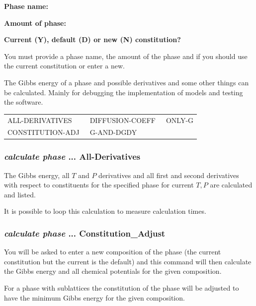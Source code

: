 \documentclass[11pt]{article}
\begin{document}
{\bf Phase name:}

{\bf Amount of phase:}

{\bf Current (Y), default (D) or new (N) constitution?}

You must provide a phase name, the amount of the phase and if you
should use the current constitution or enter a new.


The Gibbs energy of a phase and possible derivatives and some other
things can be calculated.  Mainly for debugging the implementation of
models and testing the software.

{\small
\begin{tabular}{lll}
ALL-DERIVATIVES  & DIFFUSION-COEFF~ & ONLY-G   \\
CONSTITUTION-ADJ~ & G-AND-DGDY        \\
\end{tabular}
}

\hypertarget{Calculate phase ... all-derivatives}{}
\hypertarget{Calculate phase ... loop}{}
\subsubsection{{\em calculate phase} ... All-Derivatives}

The Gibbs energy, all $T$ and $P$ derivatives and all first and second
derivatives with respect to constituents for the specified phase for
current $T,P$ are calculated and listed.

It is possible to loop this calculation to measure calculation times.

\hypertarget{Calculate phase adjust}{}
\subsubsection{{\em calculate phase} ... Constitution\_Adjust}

You will be asked to enter a new composition of the phase (the current
constitution but the current is the default) and this command will
then calculate the Gibbs energy and all chemical potentials for the
given composition.

For a phase with sublattices the constitution of the phase will be
adjusted to have the minimum Gibbs energy for the given composition.
\end{document}

